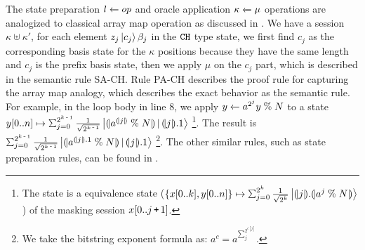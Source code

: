 \label{sec:oracle-state}
The \qafny state preparation ${l} \xleftarrow{} {op}$ and oracle application ${\kappa} \xleftarrow{} {\mu}$ operations
are analogized to classical array map operation as discussed in . We have a session $\kappa\uplus \kappa'$, for each element $z_j\left\vert{c_{j}}\right\rangle{\beta_j}$ in the $\texttt{CH}$ type state, we first find $c_{j}$ as the corresponding basis state for the $\kappa$ positions because they have the same length and $c_j$ is the prefix basis state, then we apply $\mu$ on the $c_{j}$ part, which is described in the semantic rule \textsc{SA-CH}. Rule \textsc{PA-CH} describes the proof rule for capturing the array map analogy, which describes the exact behavior as the semantic rule.
For example, in the loop body in  line 8, we apply ${y} \xleftarrow{} {a^{2^j}y\;\%\; N}$ to a state $y[0..n] \mapsto \sch{2^{k\,\sminus\,1}}{\frac{1}{\sqrt{2^{k\,\sminus\,1}}}}{\tos{a^{\tos{j}}\;\%\;N} \,|\,\tos{j}.1}$ \footnote{The state is a equivalence state ($\{x[0..k],y[0..n]\} \mapsto \sch{2^k}{\frac{1}{\sqrt{2^k}}}{\tos{j}.\tos{a^{j}\;\%\;N}}$) of the masking session $x[0..j\,\texttt{+}\,1]$.}. The result is $\sch{2^{k\,\sminus\,1}}{\frac{1}{\sqrt{2^{k\,\sminus\,1}}}}{\tos{a^{\tos{j}.1}\;\%\;N} \,|\,\tos{j}.1}$ \footnote{We take the bitstring exponent formula as: $a^{c}= a^{\sum_{j}^{2^{c[j]}}}$. }.
The other similar rules, such as state preparation rules, can be found in . 

